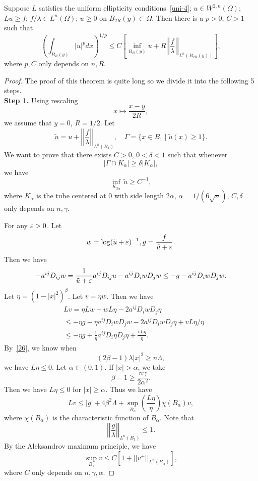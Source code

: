 \begin{theorem} Suppose $L$ satisfies the uniform ellipticity conditions~\eqref{uni-4}; $u\in W^{2,n}(\Omega)$; $Lu\geq f$; $f/\lambda\in L^n(\Omega)$; $u\geq 0$ on $B_{2R}(y)\subset\Omega$. Then there is a $p>0$, $C>1$ such that
\[
\left(\int_{B_R(y)}|u|^p dx\right)^{1/p}\leq C\left[\inf_{B_R(y)} u+R
\left|\left|\frac{f}{\lambda}\right|\right|_{L^n(B_{2R}(y))}\right],
\]
where $p,C$ only depends on $n,R$.
\end{theorem}


\begin{proof} The proof  of this theorem is quite long so we divide it into the following 5 steps.\\

{\bf Step 1.} Using rescaling
\[
x\mapsto\frac{x-y}{2R},
\]
we assume that $y=0$, $R=1/2$. Let 
\[
\tilde u=u+\left|\left|\frac{f}{\lambda}\right|\right|_{L^n(B_1)},\quad \Gamma=\{x\in B_1\mid\tilde u(x)\geq 1\}.
\]
We want to prove that there exists $C>0$, $0<\delta<1$ such that whenever
\begin{equation}\label{27-1}
|\Gamma\cap K_\alpha|\geq\delta|K_\alpha|,
\end{equation}
we have
\begin{equation}\label{27}
\inf_{K_{3\alpha}}\,\tilde u\geq C^{-1},
\end{equation}
where $K_\alpha$ is the tube centered at $0$ with side length $2\alpha$, $\alpha=1/(6\sqrt n)$, $C,\delta$ only depends on $n,\gamma$.

For any $\varepsilon>0$. Let 
\[
w=\log(\tilde u+\varepsilon)^{-1}, g=\frac{f}{\tilde u+\varepsilon}.
\]
Then we have
\[
-a^{ij}D_{ij} w=\frac{1}{\tilde u+\varepsilon}a^{ij} D_{ij} u-a^{ij}D_iwD_jw
\leq -g-a^{ij} D_iw D_jw.
\]
Let $\eta=(1-|x|^2)^\beta$. Let $v=\eta w$. Then we have
\begin{align*}
& Lv=\eta Lw+w L\eta-2a^{ij}D_i wD_j \eta\\
&\leq -\eta g-\eta a^{ij}D_i w D_j w-2a^{ij} D_iw D_j\eta+vL\eta/\eta\\
&\leq -\eta g+\frac 1\eta a^{ij} D_i\eta D_j\eta+\frac{v L\eta}{\eta}.
\end{align*}
By~\eqref{26}, we know when
\[
(2\beta-1)\lambda|x|^2\geq n\Lambda,
\]
we have $L\eta\leq 0$. Let $\alpha\in(0,1)$. If $|x|>\alpha$, we take 
\[
\beta-1\geq\frac{n\gamma}{2\alpha^2}.
\]
Then we have $L\eta\leq 0$ for $|x|\geq \alpha$. Thus we have
\[
Lv\leq|g|+4\beta^2\Lambda+\sup_{B_\alpha}\left(\frac{L\eta}{\eta}\right)\chi(B_\alpha) v,
\]
where $\chi(B_\alpha)$ is the characteristic function of $B_\alpha$. Note that
\[
\left|\left|\frac{g}{\lambda}\right|\right|_{L^n(B_1)}\leq 1.
\]
By the Aleksandrov maximum principle, we have
\begin{equation}\label{new-1}
\sup_{B_1} v\leq C[1+||v^+||_{L^n(B_\alpha)}],
\end{equation}
where $C$ only depends on $n,\gamma,\alpha$.


\end{proof}
